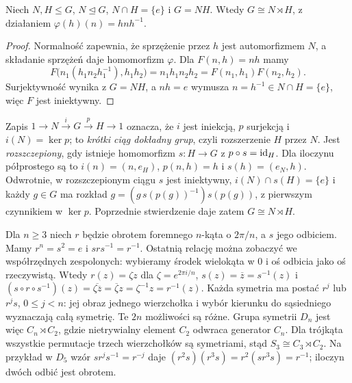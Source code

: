 \begin{stwierdzenie}
Niech $N,H\leq G$, $N\trianglelefteq G$, $N\cap H=\{e\}$ i $G=NH$.
Wtedy $G\cong N\rtimes H$, z działaniem $\varphi(h)(n)=hnh^{-1}$.
\end{stwierdzenie}
\begin{proof}
Normalność zapewnia, że sprzężenie przez $h$ jest automorfizmem $N$,
a składanie sprzężeń daje homomorfizm $\varphi$.
Dla $F(n,h)=nh$ mamy
\[
 F\bigl(n_1(h_1n_2h_1^{-1}),h_1h_2\bigr)
 =n_1h_1n_2h_2=F(n_1,h_1)F(n_2,h_2).
\]
Surjektywność wynika z $G=NH$, a $nh=e$ wymusza
$n=h^{-1}\in N\cap H=\{e\}$, więc $F$ jest iniektywny.
\end{proof}

\begin{uwaga}
Zapis $1\to N\xrightarrow{i}G\xrightarrow{p}H\to1$ oznacza,
że $i$ jest iniekcją, $p$ surjekcją i $i(N)=\ker p$; to
\emph{krótki ciąg dokładny grup}, czyli rozszerzenie $H$ przez $N$.
Jest \emph{rozszczepiony}, gdy istnieje homomorfizm $s:H\to G$
z $p\circ s=\mathrm{id}_H$. Dla iloczynu półprostego są to
$i(n)=(n,e_H)$, $p(n,h)=h$ i $s(h)=(e_N,h)$.
Odwrotnie, w rozszczepionym ciągu $s$ jest iniektywny,
$i(N)\cap s(H)=\{e\}$ i każdy $g\in G$ ma rozkład
$g=(g\,s(p(g))^{-1})s(p(g))$, z pierwszym czynnikiem w $\ker p$.
Poprzednie stwierdzenie daje zatem $G\cong N\rtimes H$.
\end{uwaga}

\begin{przyklad}
Dla $n\geq3$ niech $r$ będzie obrotem foremnego $n$-kąta o $2\pi/n$,
a $s$ jego odbiciem. Mamy $r^n=s^2=e$ i $srs^{-1}=r^{-1}$.
Ostatnią relację można zobaczyć we współrzędnych zespolonych:
wybieramy środek wielokąta w $0$ i oś odbicia jako oś rzeczywistą.
Wtedy $r(z)=\zeta z$ dla $\zeta=e^{2\pi i/n}$,
$s(z)=\overline z=s^{-1}(z)$ i
$(s\circ r\circ s^{-1})(z)=\overline{\zeta\overline z}
=\overline\zeta z=\zeta^{-1}z=r^{-1}(z)$.
Każda symetria ma postać $r^j$ lub $r^js$, $0\leq j<n$:
jej obraz jednego wierzchołka i wybór kierunku do sąsiedniego
wyznaczają całą symetrię. Te $2n$ możliwości są różne.
Grupa symetrii $D_n$ jest więc $C_n\rtimes C_2$, gdzie nietrywialny
element $C_2$ odwraca generator $C_n$. Dla trójkąta wszystkie
permutacje trzech wierzchołków są symetriami, stąd
$S_3\cong C_3\rtimes C_2$.
Na przykład w $D_5$ wzór $sr^js^{-1}=r^{-j}$ daje
$(r^2s)(r^3s)=r^2(sr^3s)=r^{-1}$; iloczyn dwóch odbić jest obrotem.
\end{przyklad}

